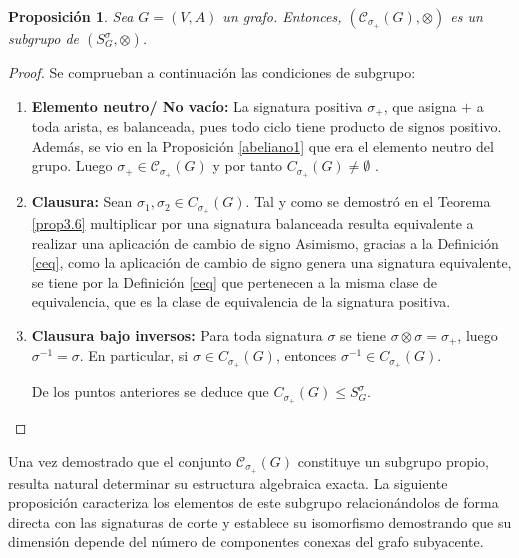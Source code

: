 \documentclass[11pt,a4paper,spanish]{report}
\theoremstyle{plain}
\newtheorem{proposicion}[teorema]{Proposición}
\begin{document}
\begin{proposicion}
Sea $G=(V,A)$ un grafo. Entonces,  $(\mathcal{C}_{\sigma_+}(G), \otimes)$ es un subgrupo de $(S_G^{\sigma},\otimes)$.
\end{proposicion}
\begin{proof}

   
 Se comprueban a continuación las condiciones de subgrupo:
\begin{enumerate}
\item[(i)]\textbf{Elemento neutro/ No vacío:}
La signatura positiva $\sigma_+$, que asigna $+$ a toda arista, es balanceada, pues todo ciclo tiene producto de signos positivo. Además, se vio en la Proposición \ref{abeliano1} que era el elemento neutro del grupo. Luego $\sigma_+ \in\mathcal{C}_{\sigma_+}(G)$ y por tanto $ C_{\sigma_+}(G)\neq \emptyset$ .

\item [(ii)] \textbf{Clausura:}
Sean $\sigma_1,\sigma_2 \in C_{\sigma_+}(G)$. Tal y como se demostró en el Teorema \ref{prop3.6} multiplicar por una signatura balanceada resulta equivalente a realizar una aplicación de cambio de signo Asimismo, gracias a la Definición \ref{ceq}, como la aplicación de cambio de signo genera una signatura equivalente, se tiene por la Definición \ref{ceq} que pertenecen a la misma clase de equivalencia, que es la clase de equivalencia de la signatura positiva.

\item[(iii)]\textbf{Clausura bajo inversos:}
Para toda signatura $\sigma$ se tiene $\sigma \otimes \sigma = \sigma_+$, luego $\sigma^{-1} = \sigma$. En particular, si $\sigma \in  C_{\sigma_+}(G)$, entonces $\sigma^{-1} \in  C_{\sigma_+}(G)$.

De los puntos anteriores se deduce que $ C_{\sigma_+}(G) \le S_G^{\sigma}$.
\end{enumerate}
\end{proof}

Una vez demostrado que el conjunto $\mathcal{C}_{\sigma_+}(G)$ constituye un subgrupo propio, resulta natural determinar su estructura algebraica exacta. La siguiente proposición caracteriza los elementos de este subgrupo relacionándolos de forma directa con las signaturas de corte y establece su isomorfismo demostrando que su dimensión depende del número de componentes conexas del grafo subyacente.
\end{document}
